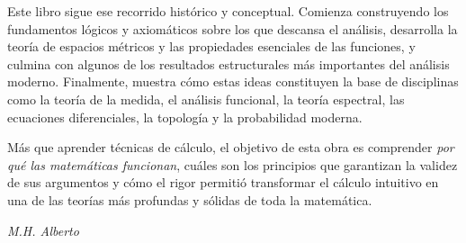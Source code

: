 Este libro sigue ese recorrido histórico y conceptual. Comienza construyendo los fundamentos lógicos y axiomáticos sobre los que descansa el análisis, desarrolla la teoría de espacios métricos y las propiedades esenciales de las funciones, y culmina con algunos de los resultados estructurales más importantes del análisis moderno. Finalmente, muestra cómo estas ideas constituyen la base de disciplinas como la teoría de la medida, el análisis funcional, la teoría espectral, las ecuaciones diferenciales, la topología y la probabilidad moderna.

Más que aprender técnicas de cálculo, el objetivo de esta obra es comprender \emph{por qué las matemáticas funcionan}, cuáles son los principios que garantizan la validez de sus argumentos y cómo el rigor permitió transformar el cálculo intuitivo en una de las teorías más profundas y sólidas de toda la matemática.

\vspace{1em}
\begin{flushright}
\textit{M.H. Alberto}
\end{flushright}
